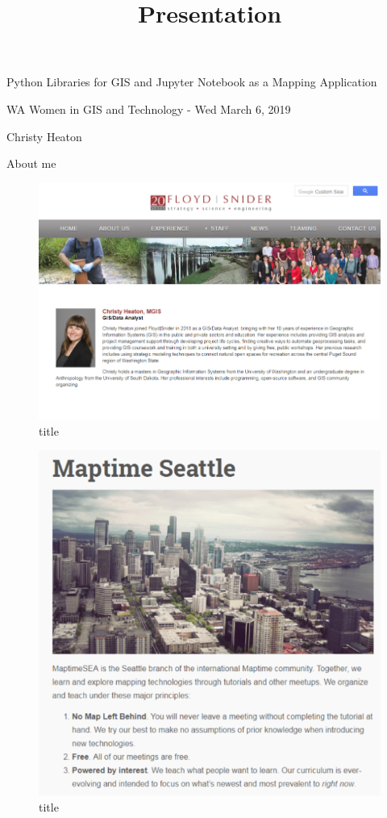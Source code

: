 \documentclass[11pt]{article}
\title{Presentation}
\makeatletter
\def\maxwidth{\ifdim\Gin@nat@width>\linewidth\linewidth
    \else\Gin@nat@width\fi}
\let\Oldincludegraphics\includegraphics
\renewcommand{\includegraphics}[1]{\Oldincludegraphics[width=.8\maxwidth]{#1}}
\makeatother
\begin{document}
    
    
    \maketitle
    
    

    
    Python Libraries for GIS and Jupyter Notebook as a Mapping Application

WA Women in GIS and Technology - Wed March 6, 2019

Christy Heaton

    About me

    \begin{figure}
\centering
\includegraphics{img/FS_bio.PNG}
\caption{title}
\end{figure}

    \begin{figure}
\centering
\includegraphics{img/maptimeseattle_website.PNG}
\caption{title}
\end{figure}
\end{document}
